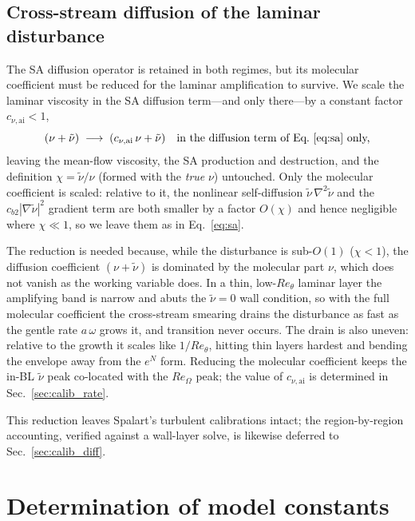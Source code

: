 \documentclass[journal]{new-aiaa}
\begin{document}
\subsection{Cross-stream diffusion of the laminar disturbance}\label{sec:nulamscale}
The SA diffusion operator is retained in both regimes, but its molecular
coefficient must be reduced for the laminar amplification to survive. We scale
the laminar viscosity in the SA diffusion term---and only there---by a constant
factor $c_{\nu,\mathrm{ai}}\!<\!1$,
\begin{equation}
  (\nu+\tilde\nu)\;\longrightarrow\;(c_{\nu,\mathrm{ai}}\,\nu+\tilde\nu)
  \quad\text{in the diffusion term of Eq.~\eqref{eq:sa} only,}
  \label{eq:nulamscale}
\end{equation}
leaving the mean-flow viscosity, the SA production and destruction, and the
definition $\chi=\tilde\nu/\nu$ (formed with the \emph{true} $\nu$) untouched.
Only the molecular coefficient is scaled: relative to it, the nonlinear
self-diffusion $\tilde\nu\,\nabla^2\tilde\nu$ and the $c_{b2}|\nabla\tilde\nu|^2$
gradient term are both smaller by a factor $O(\chi)$ and hence
negligible where $\chi\!\ll\!1$, so we leave them as in Eq.~\eqref{eq:sa}.

The reduction is needed because, while the disturbance is sub-$O(1)$
($\chi\!<\!1$), the diffusion coefficient $(\nu+\tilde\nu)$ is dominated by the
molecular part $\nu$, which does not vanish as the working variable does. In a
thin, low-$Re_\theta$ laminar layer the amplifying band is narrow and abuts the
$\tilde\nu\!=\!0$ wall condition, so with the full molecular coefficient the
cross-stream smearing drains the disturbance as fast as the gentle rate
$a\,\omega$ grows it, and transition never occurs. The drain is also
uneven: relative to the growth it scales like $1/Re_\theta$, hitting thin
layers hardest and bending the envelope away from the $e^N$ form. Reducing the molecular
coefficient keeps the in-BL $\tilde\nu$ peak co-located with the $Re_\Omega$
peak; the value of $c_{\nu,\mathrm{ai}}$ is determined in
Sec.~\ref{sec:calib_rate}.

This reduction leaves Spalart's turbulent calibrations intact; the
region-by-region accounting, verified against a wall-layer solve, is likewise
deferred to Sec.~\ref{sec:calib_diff}.

\section{Determination of model constants}\label{sec:calib}
\end{document}

